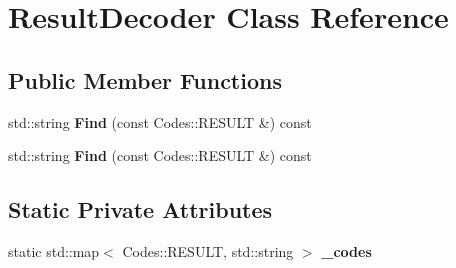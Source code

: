 \hypertarget{classResultDecoder}{
\section{ResultDecoder Class Reference}
\label{classResultDecoder}
}
\subsection*{Public Member Functions}
\begin{DoxyCompactItemize}
\item 
\hypertarget{classResultDecoder_af36f0e04752a354748bbada8c480c2b5}{
std::string {\bfseries Find} (const Codes::RESULT \&) const }
\label{classResultDecoder_af36f0e04752a354748bbada8c480c2b5}

\item 
\hypertarget{classResultDecoder_af36f0e04752a354748bbada8c480c2b5}{
std::string {\bfseries Find} (const Codes::RESULT \&) const }
\label{classResultDecoder_af36f0e04752a354748bbada8c480c2b5}

\end{DoxyCompactItemize}
\subsection*{Static Private Attributes}
\begin{DoxyCompactItemize}
\item 
\hypertarget{classResultDecoder_aa8ba704b726b200f20dcc99eb3d5f958}{
static std::map$<$ Codes::RESULT, std::string $>$ {\bfseries \_\-codes}}
\label{classResultDecoder_aa8ba704b726b200f20dcc99eb3d5f958}

\end{DoxyCompactItemize}
